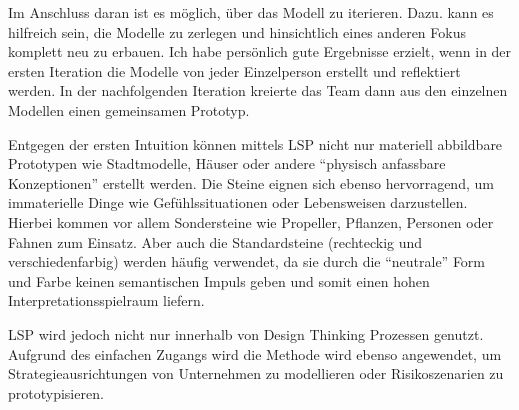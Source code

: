 Im Anschluss daran ist es möglich, über das Modell zu iterieren. Dazu. kann es hilfreich sein, die Modelle zu zerlegen und hinsichtlich eines anderen Fokus komplett neu zu erbauen.
Ich habe persönlich gute Ergebnisse erzielt, wenn in der ersten Iteration die Modelle von jeder Einzelperson erstellt und reflektiert werden. In der nachfolgenden Iteration kreierte das Team dann aus den einzelnen Modellen einen gemeinsamen Prototyp.\newline

Entgegen der ersten Intuition können mittels LSP nicht nur materiell abbildbare Prototypen wie Stadtmodelle, Häuser oder andere ``physisch anfassbare Konzeptionen'' erstellt werden. Die Steine eignen sich ebenso hervorragend, um immaterielle Dinge wie Gefühlssituationen oder Lebensweisen darzustellen. Hierbei kommen vor allem Sondersteine wie Propeller, Pflanzen, Personen oder Fahnen zum Einsatz. Aber auch die Standardsteine (rechteckig und verschiedenfarbig) werden häufig verwendet, da sie durch die ``neutrale'' Form und Farbe keinen semantischen Impuls geben und somit einen hohen Interpretationsspielraum liefern. \newline

LSP wird jedoch nicht nur innerhalb von Design Thinking Prozessen genutzt. Aufgrund des einfachen Zugangs wird die Methode wird ebenso angewendet, um Strategieausrichtungen von Unternehmen zu modellieren oder Risikoszenarien zu prototypisieren.